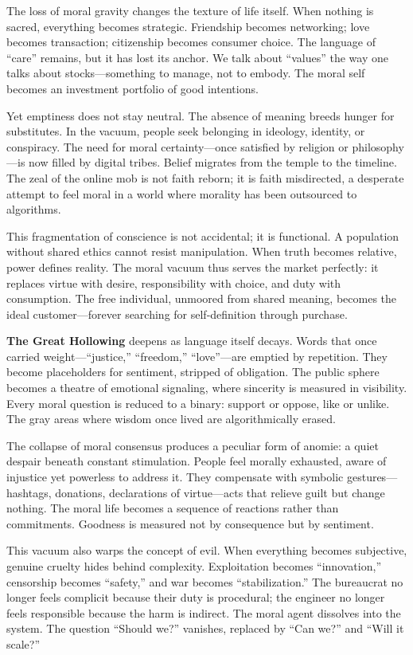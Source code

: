 \documentclass[11pt,twoside]{book}
\begin{document}
The loss of moral gravity changes the texture of life itself.  When nothing is sacred, everything becomes strategic.  Friendship becomes networking; love becomes transaction; citizenship becomes consumer choice.  The language of “care” remains, but it has lost its anchor.  We talk about “values” the way one talks about stocks—something to manage, not to embody.  The moral self becomes an investment portfolio of good intentions.

Yet emptiness does not stay neutral.  The absence of meaning breeds hunger for substitutes.  In the vacuum, people seek belonging in ideology, identity, or conspiracy.  The need for moral certainty—once satisfied by religion or philosophy—is now filled by digital tribes.  Belief migrates from the temple to the timeline.  The zeal of the online mob is not faith reborn; it is faith misdirected, a desperate attempt to feel moral in a world where morality has been outsourced to algorithms.

This fragmentation of conscience is not accidental; it is functional.  A population without shared ethics cannot resist manipulation.  When truth becomes relative, power defines reality.  The moral vacuum thus serves the market perfectly: it replaces virtue with desire, responsibility with choice, and duty with consumption.  The free individual, unmoored from shared meaning, becomes the ideal customer—forever searching for self-definition through purchase.

\textbf{The Great Hollowing} deepens as language itself decays.  Words that once carried weight—“justice,” “freedom,” “love”—are emptied by repetition.  They become placeholders for sentiment, stripped of obligation.  The public sphere becomes a theatre of emotional signaling, where sincerity is measured in visibility.  Every moral question is reduced to a binary: support or oppose, like or unlike.  The gray areas where wisdom once lived are algorithmically erased.

The collapse of moral consensus produces a peculiar form of anomie: a quiet despair beneath constant stimulation.  People feel morally exhausted, aware of injustice yet powerless to address it.  They compensate with symbolic gestures—hashtags, donations, declarations of virtue—acts that relieve guilt but change nothing.  The moral life becomes a sequence of reactions rather than commitments.  Goodness is measured not by consequence but by sentiment.

This vacuum also warps the concept of evil.  When everything becomes subjective, genuine cruelty hides behind complexity.  Exploitation becomes “innovation,” censorship becomes “safety,” and war becomes “stabilization.”  The bureaucrat no longer feels complicit because their duty is procedural; the engineer no longer feels responsible because the harm is indirect.  The moral agent dissolves into the system.  The question “Should we?” vanishes, replaced by “Can we?” and “Will it scale?”
\end{document}
